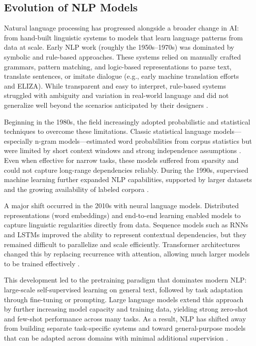 \subsection{Evolution of NLP Models}

Natural language processing has progressed alongside a broader change in AI: from hand-built linguistic systems to models that learn language patterns from data at scale. Early NLP work (roughly the 1950s–1970s) was dominated by symbolic and rule-based approaches. These systems relied on manually crafted grammars, pattern matching, and logic-based representations to parse text, translate sentences, or imitate dialogue (e.g., early machine translation efforts and ELIZA). While transparent and easy to interpret, rule-based systems struggled with ambiguity and variation in real-world language and did not generalize well beyond the scenarios anticipated by their designers \cite{chen2025deeplearningmachinelearning}.

Beginning in the 1980s, the field increasingly adopted probabilistic and statistical techniques to overcome these limitations. Classic statistical language models—especially n-gram models—estimated word probabilities from corpus statistics but were limited by short context windows and strong independence assumptions \cite{zhao2025surveylargelanguagemodels}. Even when effective for narrow tasks, these models suffered from sparsity and could not capture long-range dependencies reliably. During the 1990s, supervised machine learning further expanded NLP capabilities, supported by larger datasets and the growing availability of labeled corpora \cite{chen2025deeplearningmachinelearning}.

A major shift occurred in the 2010s with neural language models. Distributed representations (word embeddings) and end-to-end learning enabled models to capture linguistic regularities directly from data. Sequence models such as RNNs and LSTMs improved the ability to represent contextual dependencies, but they remained difficult to parallelize and scale efficiently. Transformer architectures changed this by replacing recurrence with attention, allowing much larger models to be trained effectively \cite{chen2025deeplearningmachinelearning}.

This development led to the pretraining paradigm that dominates modern NLP: large-scale self-supervised learning on general text, followed by task adaptation through fine-tuning or prompting. Large language models extend this approach by further increasing model capacity and training data, yielding strong zero-shot and few-shot performance across many tasks. As a result, NLP has shifted away from building separate task-specific systems and toward general-purpose models that can be adapted across domains with minimal additional supervision \cite{zhao2025surveylargelanguagemodels}.


